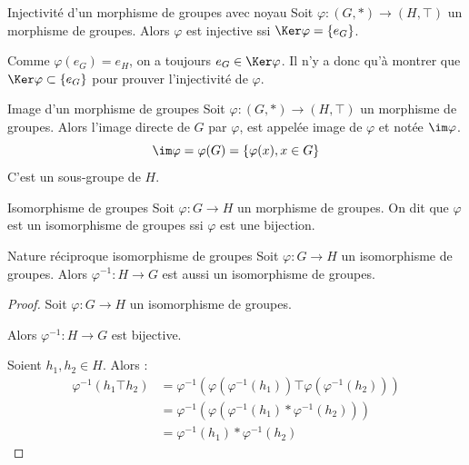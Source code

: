 \begin{theoreme}{Injectivité d'un morphisme de groupes avec noyau}{}
    Soit $\varphi : (G, \ast) \to (H, \top)$ un morphisme de groupes.
    Alors $\varphi$ est injective ssi $\Ker \varphi = \{e_G\}$.
\end{theoreme}

\begin{remarque}
    Comme $\varphi(e_G) = e_H$, on a toujours $e_G \in \Ker \varphi$.
    Il n'y a donc qu'à montrer que $\Ker \varphi \subset \{e_G\}$ pour prouver l'injectivité de $\varphi$.
\end{remarque}

\begin{proposition}{Image d'un morphisme de groupes}{}
    Soit $\varphi : (G, \ast) \to (H, \top)$ un morphisme de groupes. Alors l'image directe de 
    $G$ par $\varphi$, est appelée image de $\varphi$ et notée $\im \varphi$.
    \[\im \varphi = \varphi(G) = \{\varphi(x), x \in G\}\]
    C'est un sous-groupe de $H$.
\end{proposition}

\begin{definition}{Isomorphisme de groupes}{}
    Soit $\varphi : G \to H$ un morphisme de groupes. On dit que $\varphi$ est un isomorphisme 
    de groupes ssi $\varphi$ est une bijection. 
\end{definition}

\begin{theoreme}{Nature réciproque isomorphisme de groupes}{}
    Soit $\varphi : G \to H$ un isomorphisme de groupes. Alors $\varphi^{-1} : H \to G$ est aussi un isomorphisme de
    groupes.
\end{theoreme}


\begin{proof}
    Soit $\varphi : G \to H$ un isomorphisme de groupes. 

    Alors $\varphi^{-1} : H \to G$ est bijective. 

    Soient $h_1, h_2 \in H$. Alors :
    \begin{align*}
        \varphi^{-1}(h_1 \top h_2) & = \varphi^{-1}(\varphi(\varphi^{-1}(h_1)) \top \varphi(\varphi^{-1}(h_2)))\\
        & = \varphi^{-1}(\varphi(\varphi^{-1}(h_1) \ast \varphi^{-1}(h_2))) \\
        & = \varphi^{-1}(h_1) \ast \varphi^{-1}(h_2)
    \end{align*}
\end{proof}


